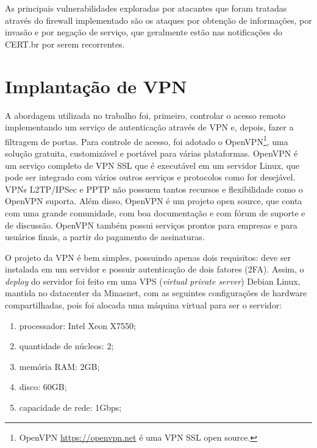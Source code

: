     
    
    
    As principais vulnerabilidades exploradas por atacantes que foram tratadas através do firewall implementado são os ataques por obtenção de informações, por invasão e por negação de serviço, que geralmente estão nas notificações do CERT.br por serem recorrentes.

\section{Implantação de VPN}

    A abordagem utilizada no trabalho foi, primeiro, controlar o acesso remoto implementando um serviço de autenticação através de VPN e, depois, fazer a filtragem de portas. Para controle de acesso, foi adotado o OpenVPN\footnote{OpenVPN \url{https://openvpn.net} é uma VPN SSL open source.}, uma solução gratuita, customizável e portável para várias plataformas. OpenVPN é um serviço completo de VPN SSL que é executável em um servidor Linux, que pode ser integrado com vários outros serviços e protocolos como for desejável. VPNs L2TP/IPSec e PPTP não possuem tantos recursos e flexibilidade como o OpenVPN suporta. Além disso, OpenVPN é um projeto open source, que conta com uma grande comunidade, com boa documentação e com fórum de suporte e de discussão. OpenVPN também possui serviços prontos para empresas e para usuários finais, a partir do pagamento de assinaturas.
    
    O projeto da VPN é bem simples, possuindo apenas dois requisitos: deve ser instalada em um servidor e possuir autenticação de dois fatores (2FA). Assim, o \textit{deploy} do servidor foi feito em uma VPS (\textit{virtual private server}) Debian Linux, mantida no datacenter da Minasnet, com as seguintes configurações de hardware compartilhadas, pois foi alocada uma máquina virtual para ser o servidor:
    
    \begin{enumerate}[label=\alph*)]
        \item processador: Intel Xeon X7550;
        \item quantidade de núcleos: 2;
        \item memória RAM: 2GB;
        \item disco: 60GB;
        \item capacidade de rede: 1Gbps;
    \end{enumerate}
    
